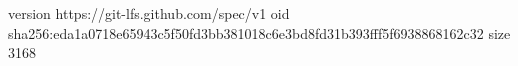 version https://git-lfs.github.com/spec/v1
oid sha256:eda1a0718e65943c5f50fd3bb381018c6e3bd8fd31b393fff5f6938868162c32
size 3168
